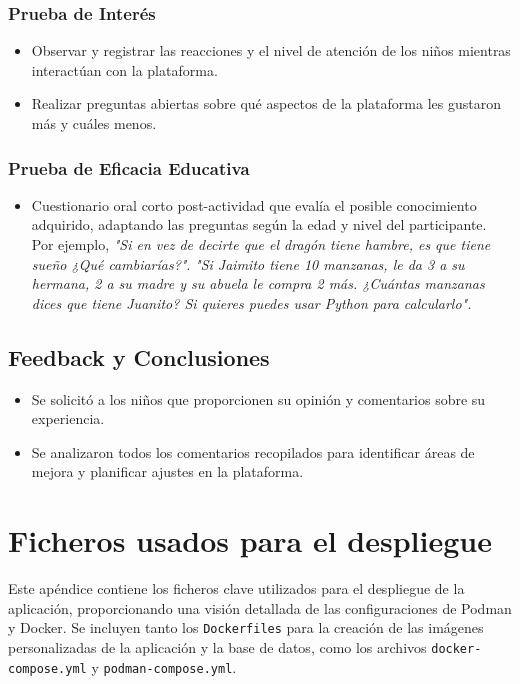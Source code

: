 \begin{appendices}
\subsection*{Prueba de Interés}
\begin{itemize}
    \item Observar y registrar las reacciones y el nivel de atención de los niños mientras interactúan con la plataforma.
    \item Realizar preguntas abiertas sobre qué aspectos de la plataforma les gustaron más y cuáles menos.
\end{itemize}

\subsection*{Prueba de Eficacia Educativa}
\begin{itemize}
    \item Cuestionario oral corto post-actividad que evalía el posible conocimiento adquirido, adaptando las preguntas según la edad y nivel del participante. Por ejemplo, \textit{"Si en vez de decirte que el dragón tiene hambre, es que tiene sueño ¿Qué cambiarías?"}. \textit{"Si Jaimito tiene 10 manzanas, le da 3 a su hermana, 2 a su madre y su abuela le compra 2 más. ¿Cuántas manzanas dices que tiene Juanito? Si quieres puedes usar Python para calcularlo".}
\end{itemize}

\section{Feedback y Conclusiones}
\begin{itemize}
    \item Se solicitó a los niños que proporcionen su opinión y comentarios sobre su experiencia.
    \item Se analizaron todos los comentarios recopilados para identificar áreas de mejora y planificar ajustes en la plataforma.
\end{itemize}

\chapter{Ficheros usados para el despliegue} \label{podmananddockerfile}

Este apéndice contiene los ficheros clave utilizados para el despliegue de la aplicación, proporcionando una visión detallada de las configuraciones de Podman y Docker. Se incluyen tanto los \texttt{Dockerfiles} para la creación de las imágenes personalizadas de la aplicación y la base de datos, como los archivos \texttt{docker-compose.yml} y \texttt{podman-compose.yml}.


\end{appendices}

